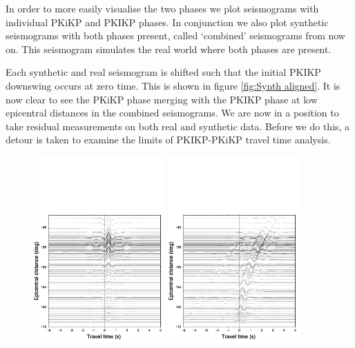 \documentclass[11pt,a4paper]{article}
\begin{document}
In order to more easily visualise the two phases we plot seismograms with individual PKiKP and PKIKP phases. In conjunction we also plot synthetic seismograms with both phases present, called `combined' seismograms from now on. This seismogram simulates the real world where both phases are present.

Each synthetic and real seismogram is shifted such that the initial PKIKP downswing occurs at zero time. This is shown in figure \ref{fig:Synth aligned}. It is now clear to see the PKiKP phase merging with the PKIKP phase at low epicentral distances in the combined seismograms. We are now in a position to take residual measurements on both real and synthetic data. Before we do this, a detour is taken to examine the limits of PKIKP-PKiKP travel time analysis.

\begin{figure}
	\centering
	\includegraphics[width=0.45\textwidth]{figures/bandasea/bandasea_PKIKP_aligned-1}
	\includegraphics[width=0.45\textwidth]{figures/bandasea/bandasea_PKiKP_aligned}

\end{figure}
\end{document}
